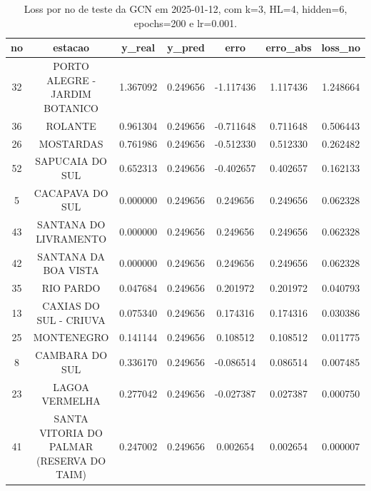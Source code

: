 \begin{table}[h]
\centering
\caption{Loss por no de teste da GCN em 2025-01-12, com k=3, HL=4, hidden=6, epochs=200 e lr=0.001.}
\label{tab:gcn_loss_k3_hl4_h6_e200_d20250112}
\begin{tabular}{ccccccc}
\toprule
no & estacao & y\_real & y\_pred & erro & erro\_abs & loss\_no \\
\midrule
32 & PORTO ALEGRE - JARDIM BOTANICO & 1.367092 & 0.249656 & -1.117436 & 1.117436 & 1.248664 \\
36 & ROLANTE & 0.961304 & 0.249656 & -0.711648 & 0.711648 & 0.506443 \\
26 & MOSTARDAS & 0.761986 & 0.249656 & -0.512330 & 0.512330 & 0.262482 \\
52 & SAPUCAIA DO SUL & 0.652313 & 0.249656 & -0.402657 & 0.402657 & 0.162133 \\
5 & CACAPAVA DO SUL & 0.000000 & 0.249656 & 0.249656 & 0.249656 & 0.062328 \\
43 & SANTANA DO LIVRAMENTO & 0.000000 & 0.249656 & 0.249656 & 0.249656 & 0.062328 \\
42 & SANTANA DA BOA VISTA & 0.000000 & 0.249656 & 0.249656 & 0.249656 & 0.062328 \\
35 & RIO PARDO & 0.047684 & 0.249656 & 0.201972 & 0.201972 & 0.040793 \\
13 & CAXIAS DO SUL - CRIUVA & 0.075340 & 0.249656 & 0.174316 & 0.174316 & 0.030386 \\
25 & MONTENEGRO & 0.141144 & 0.249656 & 0.108512 & 0.108512 & 0.011775 \\
8 & CAMBARA DO SUL & 0.336170 & 0.249656 & -0.086514 & 0.086514 & 0.007485 \\
23 & LAGOA VERMELHA & 0.277042 & 0.249656 & -0.027387 & 0.027387 & 0.000750 \\
41 & SANTA VITORIA DO PALMAR (RESERVA DO TAIM) & 0.247002 & 0.249656 & 0.002654 & 0.002654 & 0.000007 \\
\bottomrule
\end{tabular}
\end{table}
